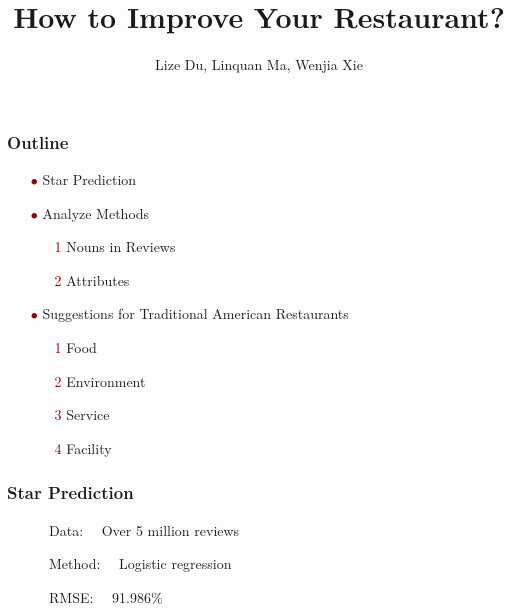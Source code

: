 \documentclass[notheorems, aspectratio=54]{beamer}
\title[Suggestions for Retaurants]{\LARGE\textbf{{How to Improve Your Restaurant?}}}
\author[L.Du, L.Ma, W.Xie]{Lize Du, Linquan Ma, Wenjia Xie}
\institute{STAT 628}
\renewcommand\textbullet{\ensuremath{\bullet}}
\begin{document}
	
	\begin{frame}
	\titlepage
\end{frame}

\begin{frame}
\frametitle{Outline}
\begin{itemize}
	\item[\textcolor{darkred}{\textbullet}] Star Prediction
	\vspace{2ex}
	
	\item[\textcolor{darkred}{\textbullet}] Analyze Methods
	\begin{itemize}
		\item[\textcolor{darkred}{1}] Nouns in Reviews
		\item[\textcolor{darkred}{2}] Attributes
	\end{itemize}
	\vspace{2ex}
	
	\item[\textcolor{darkred}{\textbullet}] Suggestions for Traditional American Restaurants
	\begin{itemize}
		\item[\textcolor{darkred}{1}] Food
		\item[\textcolor{darkred}{2}] Environment
		\item[\textcolor{darkred}{3}] Service
		\item[\textcolor{darkred}{4}] Facility
	\end{itemize}
\end{itemize}

\end{frame}

\begin{frame}
\frametitle{Star Prediction}
\ \ \ \ \ \ Data: \ \ Over 5 million reviews
\vspace{3ex}

\ \ \ \ \ \ Method: \ \  Logistic regression
\vspace{3ex}

\ \ \ \ \ \ RMSE: \ \ 91.986\%
\vspace{3ex}

\end{frame}
\end{document}
